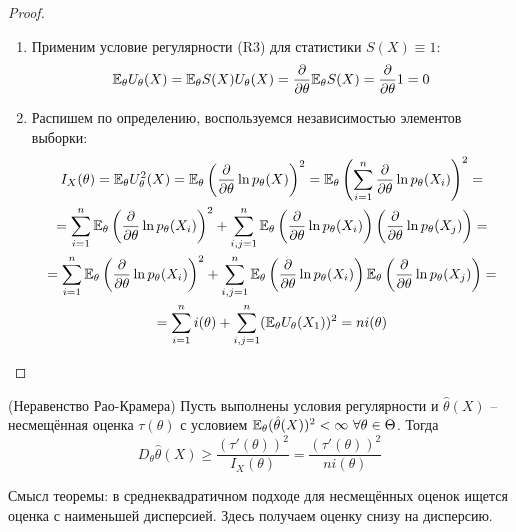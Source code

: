 \begin{proof}~
    \begin{enumerate}
        \item Применим условие регулярности (R3) для статистики $S(X) \equiv 1$:
        \[
            \mathbb{E}_\theta U_\theta(X) = \mathbb{E}_\theta S(X) U_\theta(X) = \frac{\partial}{\partial \theta} \mathbb{E}_\theta S(X) = \frac{\partial}{\partial \theta} 1 = 0 
        \]

        \item Распишем по определению, воспользуемся независимостью элементов выборки:
        \begin{multline*}
            I_X(\theta) = \mathbb{E}_\theta U_\theta^2(X) = \mathbb{E}_\theta \left(\frac{\partial}{\partial \theta} \ln p_\theta(X)\right)^2 = \mathbb{E}_\theta \left(\sum_{i=1}^n \frac{\partial}{\partial \theta} \ln p_\theta(X_i)\right)^2 =
            \\
            = \sum_{i=1}^n \mathbb{E}_\theta \left(\frac{\partial}{\partial \theta} \ln p_\theta(X_i)\right)^2 + \sum_{i,j=1}^n \mathbb{E}_\theta \left(\frac{\partial}{\partial \theta} \ln p_\theta(X_i)\right) \left(\frac{\partial}{\partial \theta} \ln p_\theta(X_j)\right) =
            \\
            = \sum_{i=1}^n \mathbb{E}_\theta \left(\frac{\partial}{\partial \theta} \ln p_\theta(X_i)\right)^2 + \sum_{i,j=1}^n \mathbb{E}_\theta \left(\frac{\partial}{\partial \theta} \ln p_\theta(X_i)\right) \mathbb{E}_\theta \left(\frac{\partial}{\partial \theta} \ln p_\theta(X_j)\right) =
            \\
            = \sum_{i=1}^n i(\theta) + \sum_{i,j=1}^n (\mathbb{E}_\theta U_\theta(X_1))^2 = n i(\theta)
        \end{multline*}
    \end{enumerate}
\end{proof}

\begin{theorem} (Неравенство Рао-Крамера)
    Пусть выполнены условия регулярности и $\hat{\theta}(X)$ -- несмещённая оценка $\tau(\theta)$ с условием $\mathbb{E}_\theta (\hat{\theta}(X))^2 < \infty \ \forall \theta \in \Theta$. Тогда
    \[
        D_\theta \hat{\theta}(X) \ge \frac{(\tau'(\theta))^2}{I_X(\theta)} = \frac{(\tau'(\theta))^2}{n i(\theta)}
    \]
\end{theorem}

\begin{note}
    Смысл теоремы: в среднеквадратичном подходе для несмещённых оценок ищется оценка с наименьшей дисперсией. Здесь получаем оценку снизу на дисперсию.
\end{note}

